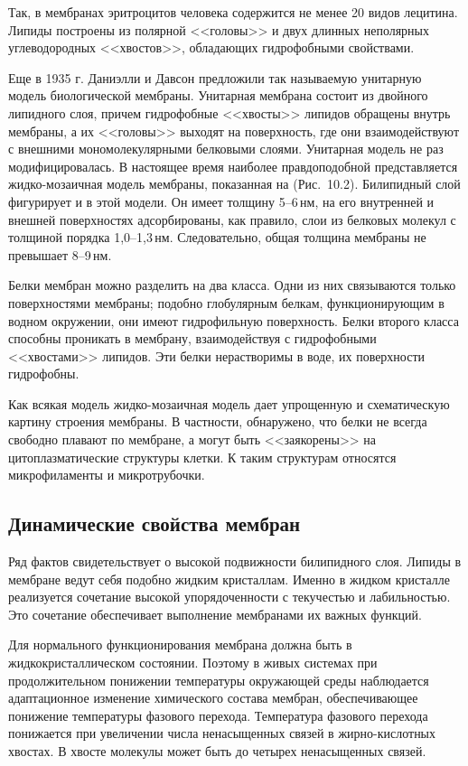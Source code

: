 \documentclass[12pt,a4paper,oneside]{book}
\begin{document}
Так, в мембранах эритроцитов человека содержится не менее 20 видов лецитина. Липиды построены из полярной <<головы>> и двух длинных неполярных углеводородных <<хвостов>>, обладающих гидрофобными свойствами. 

Еще в 1935 г. Даниэлли и Давсон предложили так называемую унитарную модель биологической мембраны. Унитарная мембрана состоит из двойного липидного слоя, причем гидрофобные <<хвосты>> липидов обращены внутрь мембраны, а их <<головы>> выходят на поверхность, где они взаимодействуют с внешними мономолекулярными белковыми слоями. Унитарная модель не раз модифицировалась. В настоящее время наиболее правдоподобной представляется жидко-мозаичная модель мембраны, показанная на (Рис.~10.2). Билипидный слой фигурирует и в этой модели. Он имеет толщину 5--6\,нм, на его внутренней и внешней поверхностях адсорбированы, как правило, слои из белковых молекул с толщиной порядка 1,0--1,3\,нм. Следовательно, общая толщина мембраны не превышает 8--9\,нм. 

Белки мембран можно разделить на два класса. Одни из них связываются только поверхностями мембраны; подобно глобулярным белкам, функционирующим в водном окружении, они имеют гидрофильную поверхность. Белки второго класса способны проникать в мембрану, взаимодействуя с гидрофобными <<хвостами>> липидов. Эти белки нерастворимы в воде, их поверхности гидрофобны. 

Как всякая модель жидко-мозаичная модель дает упрощенную и схематическую картину строения мембраны. В частности, обнаружено, что белки не всегда свободно плавают по мембране, а могут быть <<заякорены>> на цитоплазматические структуры клетки. К таким структурам относятся микрофиламенты и микротрубочки. 


\subsection{Динамические свойства мембран}

Ряд фактов свидетельствует о высокой подвижности билипидного слоя. Липиды в мембране ведут себя подобно жидким кристаллам. Именно в жидком кристалле реализуется сочетание высокой упорядоченности с текучестью и лабильностью. Это сочетание обеспечивает выполнение мембранами их важных функций. 

Для нормального функционирования мембрана должна быть в жидкокристаллическом состоянии. Поэтому в живых системах при продолжительном понижении температуры окружающей среды наблюдается адаптационное изменение химического состава мембран, обеспечивающее понижение температуры фазового перехода. Температура фазового перехода понижается при увеличении числа ненасыщенных связей в жирно-кислотных хвостах. В хвосте молекулы может быть до четырех ненасыщенных связей.
\end{document}
